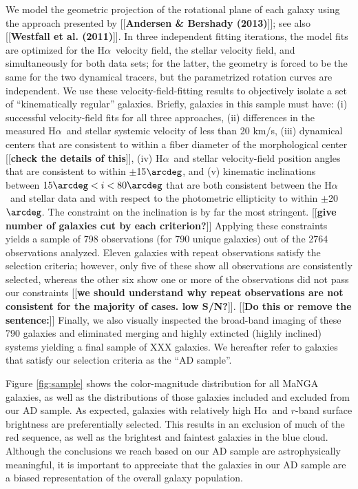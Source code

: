 \documentclass[apj,iop,revtex4,numberedappendix]{emulateapj}
\newcommand{\comment}[2][todo]{{\color{#1}[[{\bf #2}]]}}
\newcommand{\halpha}{H$\alpha$}
\begin{document}
We model the geometric projection of the rotational plane of each galaxy
using the approach presented by \comment{Andersen \& Bershady (2013)};
see also \comment{Westfall et al. (2011)}.  In three independent fitting
iterations, the model fits are optimized for the \halpha\ velocity
field, the stellar velocity field, and simultaneously for both data
sets; for the latter, the geometry is forced to be the same for the two
dynamical tracers, but the parametrized rotation curves are independent.
We use these velocity-field-fitting results to objectively isolate a set
of ``kinematically regular'' galaxies.  Briefly, galaxies in this sample
must have: (i) successful velocity-field fits for all three approaches,
(ii) differences in the measured \halpha\ and stellar systemic velocity
of less than 20 km/s, (iii) dynamical centers that are consistent to
within a fiber diameter of the morphological center \comment{check the
details of this}, (iv) \halpha\ and stellar velocity-field position
angles that are consistent to within $\pm$15$\arcdeg$, and (v) kinematic
inclinations between $15\arcdeg < i < 80\arcdeg$ that are both
consistent between the \halpha\ and stellar data and with respect to the
photometric ellipticity to within $\pm$20$\arcdeg$.  The constraint on
the inclination is by far the most stringent. \comment{give number of
galaxies cut by each criterion?}  Applying these constraints yields a
sample of 798 observations (for 790 unique galaxies) out of the 2764
observations analyzed.  Eleven galaxies with repeat observations satisfy
the selection criteria; however, only five of these show all
observations are consistently selected, whereas the other six show one
or more of the observations did not pass our constraints \comment{we
should understand why repeat observations are not consistent for the
majority of cases.  low S/N?}.  \comment{Do this or remove the
sentence:} Finally, we also visually inspected the broad-band imaging of
these 790 galaxies and eliminated merging and highly extincted (highly
inclined) systems yielding a final sample of XXX galaxies.  We hereafter
refer to galaxies that satisfy our selection criteria as the ``AD
sample''.

Figure \ref{fig:sample} shows the color-magnitude distribution for all
MaNGA galaxies, as well as the distributions of those galaxies included
and excluded from our AD sample.  As expected, galaxies with relatively
high \halpha\ and $r$-band surface brightness are preferentially
selected.  This results in an exclusion of much of the red sequence, as
well as the brightest and faintest galaxies in the blue cloud.  Although
the conclusions we reach based on our AD sample are astrophysically
meaningful, it is important to appreciate that the galaxies in our AD
sample are a biased representation of the overall galaxy population.
\end{document}
